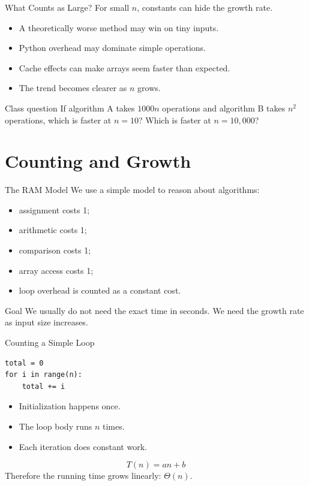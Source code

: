\documentclass[aspectratio=169,xcolor=dvipsnames]{beamer}
\begin{document}
\begin{frame}{What Counts as Large?}
  For small $n$, constants can hide the growth rate.
  \begin{itemize}
    \item A theoretically worse method may win on tiny inputs.
    \item Python overhead may dominate simple operations.
    \item Cache effects can make arrays seem faster than expected.
    \item The trend becomes clearer as $n$ grows.
  \end{itemize}
  \vspace{0.5em}
  \begin{block}{Class question}
    If algorithm A takes $1000n$ operations and algorithm B takes $n^2$ operations, which is faster at $n=10$? Which is faster at $n=10,000$?
  \end{block}
\end{frame}

\section{Counting and Growth}

\begin{frame}{The RAM Model}
  We use a simple model to reason about algorithms:
  \begin{itemize}
    \item assignment costs 1;
    \item arithmetic costs 1;
    \item comparison costs 1;
    \item array access costs 1;
    \item loop overhead is counted as a constant cost.
  \end{itemize}
  \vspace{0.5em}
  \begin{block}{Goal}
    We usually do not need the exact time in seconds. We need the growth rate as input size increases.
  \end{block}
\end{frame}

\begin{frame}[fragile]{Counting a Simple Loop}
  \begin{lstlisting}
total = 0
for i in range(n):
    total += i
  \end{lstlisting}
  \vspace{0.5em}
  \begin{itemize}
    \item Initialization happens once.
    \item The loop body runs $n$ times.
    \item Each iteration does constant work.
  \end{itemize}
  \[
    T(n) = an + b
  \]
  Therefore the running time grows linearly: $\Theta(n)$.
\end{frame}
\end{document}
